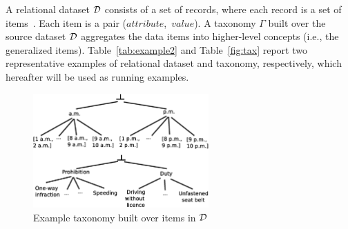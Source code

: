 A relational dataset $\cal{D}$ consists of a set of records, where each record is a set of items~\cite{KumarBook}. Each item is a pair ($attribute$,~$value$).
A taxonomy $\Gamma$ built over the source dataset $\cal{D}$  aggregates the data items into higher-level concepts (i.e., the generalized items). 
Table~\ref{tab:example2} and Table~\ref{fig:tax} report two representative examples of relational dataset and taxonomy, respectively, which hereafter will be used as running examples. 
%

\begin{figure}
\centering
\includegraphics[width=0.60\textwidth]{chapters/mgi/gerarchia/GerarchiaISPATre.eps}
\caption{Example taxonomy built over items in $\cal{D}$}
\label{fig:tax_net}
\end{figure} 

